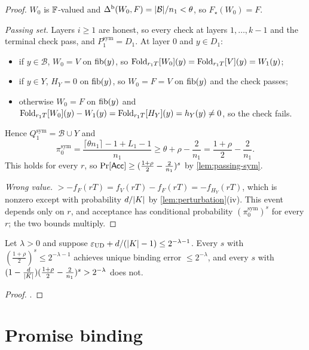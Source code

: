 \begin{proof}
$W_0$ is $\mathbb{F}$-valued and $\Delta^{\mathrm{b}}(W_0,F)=|\mathcal B|/n_1<\theta$, so $F_\star(W_0)=F$.

\emph{Passing set.} Layers $i\ge1$ are honest, so every check at layers $1,\dots,k-1$ and
the terminal check pass, and $P_1^{\mathrm{sym}}=D_1$. At layer $0$ and
$y\in D_1$:
\begin{itemize}
\item if $y\in\mathcal B$, $W_0=V$ on $\mathrm{fib}(y)$, so
$\mathrm{Fold}_{r_1T}[W_0](y)=\mathrm{Fold}_{r_1T}[V](y)=W_1(y)$;
\item if $y\in Y$, $H_Y=0$ on $\mathrm{fib}(y)$, so $W_0=F=V$ on $\mathrm{fib}(y)$ and the check passes;
\item otherwise $W_0=F$ on $\mathrm{fib}(y)$ and
$\mathrm{Fold}_{r_1T}[W_0](y)-W_1(y)=\mathrm{Fold}_{r_1T}[H_Y](y)=h_Y(y)\ne0$, so the check fails.
\end{itemize}
Hence $Q_1^{\mathrm{sym}}=\mathcal B\cup Y$ and
\[
\pi^{\mathrm{sym}}_0=\frac{\lceil\theta n_1\rceil-1+L_1-1}{n_1}\ge\theta+\rho-\frac2{n_1}
=\frac{1+\rho}2-\frac2{n_1}.
\]
This holds for every $r$, so $\Pr[\mathsf{Acc}]\ge(\frac{1+\rho}2-\frac2{n_1})^s$ by
\cref{lem:passing-sym}.

\emph{Wrong value.} $\gt-f_F(rT)=f_V(rT)-f_F(rT)=-f_{H_Y}(rT)$, which is nonzero except
with probability $d/|K|$ by \cref{lem:perturbation}(iv). This event depends only on $r$,
and acceptance has conditional probability $(\pi_0^{\mathrm{sym}})^s$ for every $r$;
the two bounds multiply.
\end{proof}

\begin{corollary}\label{cor:exact-s}
Let $\lambda>0$ and suppose $\varepsilon_{\mathrm{UD}}+d/(|K|-1)\le2^{-\lambda-1}$. Every $s$
with $(\frac{1+\rho}2)^s\le2^{-\lambda-1}$ achieves unique binding error $\le2^{-\lambda}$,
and every $s$ with
$(1-\frac d{|K|})(\frac{1+\rho}2-\frac2{n_1})^s>2^{-\lambda}$ does not.
\end{corollary}

\begin{proof}
.
\end{proof}

\section{Promise binding}

